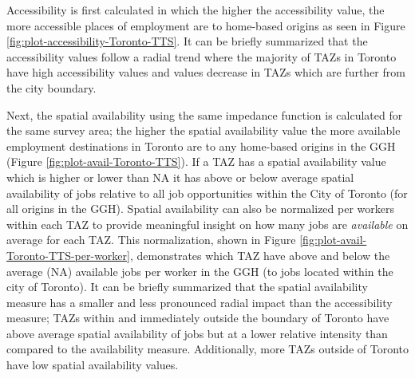 \documentclass[]{elsarticle} %
\begin{document}
Accessibility is first calculated in which the higher the accessibility
value, the more accessible places of employment are to home-based
origins as seen in Figure \ref{fig:plot-accessibility-Toronto-TTS}. It
can be briefly summarized that the accessibility values follow a radial
trend where the majority of TAZs in Toronto have high accessibility
values and values decrease in TAZs which are further from the city
boundary.

Next, the spatial availability using the same impedance function is
calculated for the same survey area; the higher the spatial availability
value the more available employment destinations in Toronto are to any
home-based origins in the GGH (Figure \ref{fig:plot-avail-Toronto-TTS}).
If a TAZ has a spatial availability value which is higher or lower than
NA it has above or below average spatial availability of jobs relative
to all job opportunities within the City of Toronto (for all origins in
the GGH). Spatial availability can also be normalized per workers within
each TAZ to provide meaningful insight on how many jobs are
\emph{available} on average for each TAZ. This normalization, shown in
Figure \ref{fig:plot-avail-Toronto-TTS-per-worker}, demonstrates which
TAZ have above and below the average (NA) available jobs per worker in
the GGH (to jobs located within the city of Toronto). It can be briefly
summarized that the spatial availability measure has a smaller and less
pronounced radial impact than the accessibility measure; TAZs within and
immediately outside the boundary of Toronto have above average spatial
availability of jobs but at a lower relative intensity than compared to
the availability measure. Additionally, more TAZs outside of Toronto
have low spatial availability values.
\end{document}
